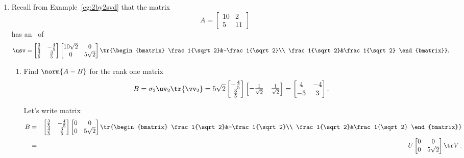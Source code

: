\begin{example}
\begin{enumerate}
\item Recall from Example~\ref{eg:2by2svd} that the matrix
\begin{equation*}
A=\begin{bmatrix} 10&2\\5&11 \end{bmatrix}
\end{equation*}
has an \svd\ of
\begin{equation*}
\usv=\begin{bmatrix} \frac35&-\frac45\\\frac45&\frac35 \end{bmatrix}
\begin{bmatrix} 10\sqrt2&0\\0&5\sqrt2 \end{bmatrix}
\tr{\begin{bmatrix} \frac1{\sqrt2}&-\frac1{\sqrt2}\\ \frac1{\sqrt2}&\frac1{\sqrt2} \end{bmatrix}}.
\end{equation*}
\begin{enumerate}
\item Find \(\norm{A-B}\) for the rank one matrix 
\begin{equation*}
B=\sigma_2\uv_2\tr{\vv_2}
=5\sqrt2\begin{bmatrix} -\frac45\\\frac35 \end{bmatrix}
\begin{bmatrix} -\frac1{\sqrt2}&\frac1{\sqrt2} \end{bmatrix}
=\begin{bmatrix} 4&-4\\-3&3 \end{bmatrix}.
\end{equation*}
\begin{solution} 
Let's write matrix
\begin{eqnarray*}
B&=&\begin{bmatrix} \frac35&-\frac45\\\frac45&\frac35 \end{bmatrix}
\begin{bmatrix} 0&0\\0&5\sqrt2 \end{bmatrix}
\tr{\begin{bmatrix} \frac1{\sqrt2}&-\frac1{\sqrt2}\\ \frac1{\sqrt2}&\frac1{\sqrt2} \end{bmatrix}}
\\&=&U\begin{bmatrix} 0&0\\0&5\sqrt2 \end{bmatrix}\tr V\,.

\end{eqnarray*}
\end{solution}
\end{enumerate}
\end{enumerate}
\end{example}
